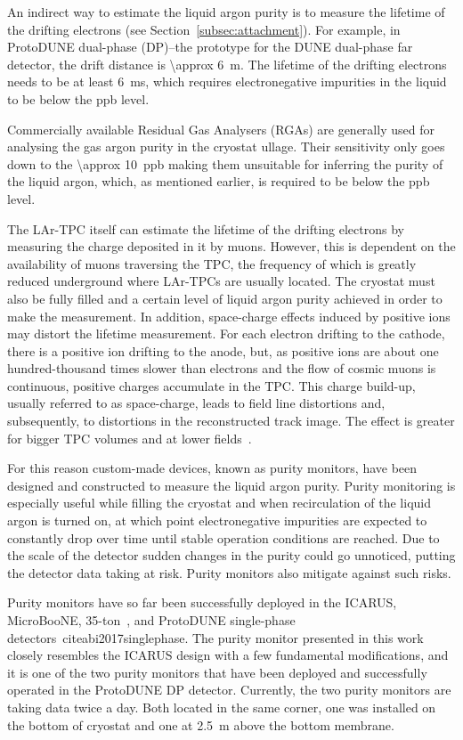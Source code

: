 \documentclass[a4paper,11pt]{article}
\begin{document}
An indirect way to estimate the liquid argon purity is to measure the lifetime of the drifting electrons (see Section~\ref{subsec:attachment}). 
For example, in ProtoDUNE dual-phase (DP)--the prototype for the DUNE dual-phase far detector, the drift distance is \SI{\approx 6}{\m}. The lifetime of the drifting electrons needs to be at least \SI{6}{ms}, which requires electronegative impurities in the liquid to be below the ppb level.
  
Commercially available Residual Gas Analysers (RGAs) are generally used for analysing the gas argon purity in the cryostat ullage. Their sensitivity only goes down to the \SI{\approx 10}{ppb} making them unsuitable for inferring the purity of the liquid argon, which, as mentioned earlier, is required to be below the ppb level. 

The LAr-TPC itself can estimate the lifetime of the drifting electrons by measuring the charge deposited in it by muons. However, this is dependent on the availability of muons traversing the TPC, the frequency of which is greatly reduced underground where LAr-TPCs are usually located. The cryostat must also be fully filled and a certain level of liquid argon purity achieved in order to make the measurement. In addition, space-charge effects induced by positive ions may distort the lifetime measurement. For each electron drifting to the cathode, there is a positive ion drifting to the anode, but, as positive ions are about one hundred-thousand times slower than electrons and the flow of cosmic muons is continuous, positive charges accumulate in the TPC. This charge build-up, usually referred to as space-charge, leads to field line distortions and, subsequently, to distortions in the reconstructed track image. The effect is greater for bigger TPC volumes and at lower fields~\cite{Romero2017}.

For this reason custom-made devices, known as purity monitors, have been designed and constructed to measure the liquid argon purity. 
Purity monitoring is especially useful while filling the cryostat and when recirculation of the liquid argon is turned on, at which point electronegative impurities are expected to constantly drop over time until stable operation conditions are reached. 
Due to the scale of the detector sudden changes in the purity could go unnoticed, putting the detector data taking at risk. Purity monitors also mitigate against such risks. 

Purity monitors have so far been successfully deployed in the ICARUS, MicroBooNE, 35-ton~\cite{IDRvol2,Wallbank:2017hfw}, and ProtoDUNE single-phase detectors~cite{abi2017singlephase}.
The purity monitor presented in this work closely resembles the ICARUS design with a few fundamental modifications, and it is one of the two purity monitors that have been deployed and successfully operated in the ProtoDUNE DP detector. Currently, the two purity monitors are taking data twice a day. Both located in the same corner, one was installed on the bottom of cryostat and one at \SI{2.5}{\metre} above the bottom membrane.
\end{document}
